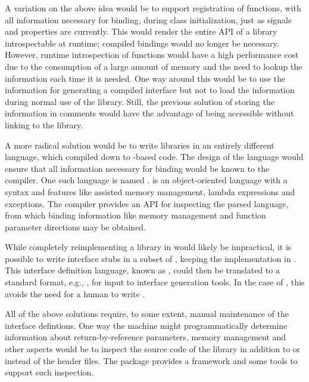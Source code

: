 \documentclass[article,shortnames]{jss}
\begin{document}
A variation on the above idea would be to support registration of
functions, with all information necessary for binding, during class 
initialization, just as signals and properties are currently. This
would render
the entire API of a library introspectable at runtime; compiled
bindings would
no longer be necessary. However, runtime introspection of functions
would
have a high performance cost due to the consumption of a large amount
of memory and the need to lookup the information each time it is
needed.  
One way around this would be to use the information for generating a
compiled interface but not to load the information during normal use
of the library. Still, the previous solution of storing the
information in comments would have the advantage of being accessible
without linking to the library.

A more radical solution would be to write libraries in an entirely
different language,
 which compiled down to -based  code. The
design of the language would ensure that all information necessary for
binding would be known to the compiler. One such language is named
 \citep{vala}.  is an object-oriented
language with a  syntax and features like assisted
memory management, lambda expressions and 
exceptions. The  compiler provides an API for
inspecting the parsed language, from which binding information like
memory management and function parameter directions may be obtained. 

While completely reimplementing a  library in
 would likely be impractical, it is possible to write
interface stubs in a subset of , keeping the
implementation in . This interface definition language,
known as , could then be translated to a standard
format, e.g., , for input to interface generation tools.
In the case of , this avoids the need for a human to
write .

All of the above solutions require, to some extent, manual maintenance
of the interface defintions. One way the machine might
programmatically determine information about
return-by-reference parameters, memory management and other aspects
would be to inspect the  source code of the library in
addition to or instead of the header files. The
 package \citep*{RGCCTU}
provides a framework and some tools to support such inspection.
\end{document}
